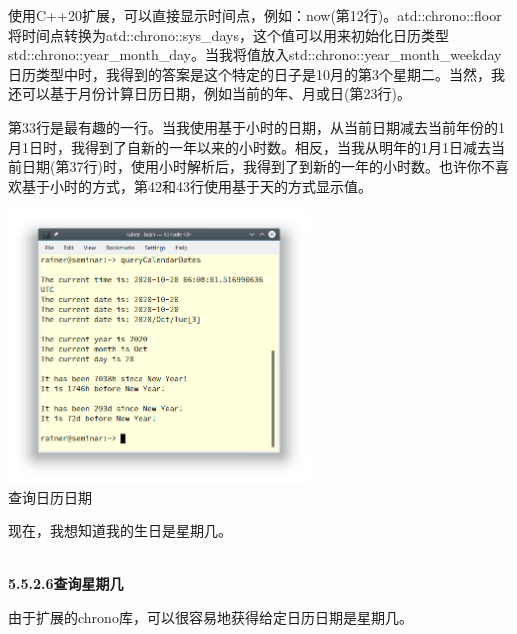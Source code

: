 使用C++20扩展，可以直接显示时间点，例如：now(第12行)。atd::chrono::floor将时间点转换为atd::chrono::sys\_days，这个值可以用来初始化日历类型std::chrono::year\_month\_day。当我将值放入std::chrono::year\_month\_weekday日历类型中时，我得到的答案是这个特定的日子是10月的第3个星期二。当然，我还可以基于月份计算日历日期，例如当前的年、月或日(第23行)。

第33行是最有趣的一行。当我使用基于小时的日期，从当前日期减去当前年份的1月1日时，我得到了自新的一年以来的小时数。相反，当我从明年的1月1日减去当前日期(第37行)时，使用小时解析后，我得到了到新的一年的小时数。也许你不喜欢基于小时的方式，第42和43行使用基于天的方式显示值。

\begin{center}
\includegraphics[width=0.6\textwidth]{content/3/chapter5/images/24.png}\\
查询日历日期
\end{center}

现在，我想知道我的生日是星期几。

\hspace*{\fill} \\ %
\noindent
\textbf{5.5.2.6\hspace{0.2cm}查询星期几}

由于扩展的chrono库，可以很容易地获得给定日历日期是星期几。

